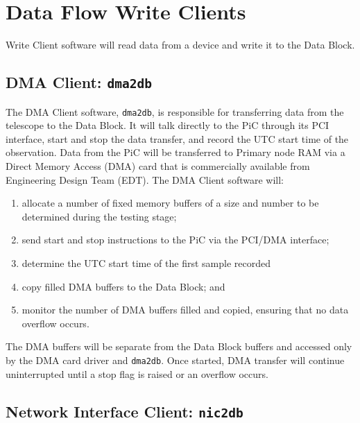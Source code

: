 \section{Data Flow Write Clients}

Write Client software will read data from a device and write it to
the Data Block.

\subsection{DMA Client: {\tt dma2db}}

The DMA Client software, {\tt dma2db}, is responsible for transferring
data from the telescope to the Data Block.  It will talk directly to
the PiC through its PCI interface, start and stop the data transfer,
and record the UTC start time of the observation.  Data from the PiC
will be transferred to Primary node RAM via a Direct Memory Access
(DMA) card that is commercially available from Engineering Design Team
(EDT).  The DMA Client software will:

\begin{enumerate}

\item allocate a number of fixed memory buffers of a size and number
to be determined during the testing stage;

\item send start and stop instructions to the PiC via the PCI/DMA interface;

\item determine the UTC start time of the first sample recorded

\item copy filled DMA buffers to the Data Block; and

\item monitor the number of DMA buffers filled and copied, ensuring that
no data overflow occurs.

\end{enumerate}

\noindent
The DMA buffers will be separate from the Data Block buffers and
accessed only by the DMA card driver and {\tt dma2db}.  Once started,
DMA transfer will continue uninterrupted until a stop flag is raised
or an overflow occurs.

\subsection{Network Interface Client: {\tt nic2db}}

